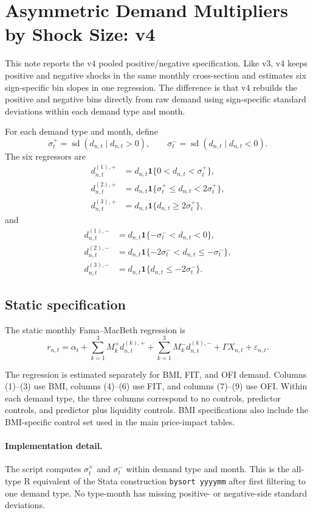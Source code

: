 \documentclass[11pt]{article}
\begin{document}
\section*{Asymmetric Demand Multipliers by Shock Size: v4}

This note reports the v4 pooled positive/negative specification. Like v3, v4
keeps positive and negative shocks in the same monthly cross-section and
estimates six sign-specific bin slopes in one regression. The difference is
that v4 rebuilds the positive and negative bins directly from raw demand using
sign-specific standard deviations within each demand type and month.

For each demand type and month, define
\[
\sigma^+_t = \operatorname{sd}(d_{n,t} \mid d_{n,t} > 0), \qquad
\sigma^-_t = \operatorname{sd}(d_{n,t} \mid d_{n,t} < 0).
\]
The six regressors are
\begin{align*}
d^{(1),+}_{n,t} &= d_{n,t}\mathbf{1}\{0 < d_{n,t} < \sigma^+_t\}, \\
d^{(2),+}_{n,t} &= d_{n,t}\mathbf{1}\{\sigma^+_t \le d_{n,t} < 2\sigma^+_t\}, \\
d^{(3),+}_{n,t} &= d_{n,t}\mathbf{1}\{d_{n,t} \ge 2\sigma^+_t\},
\end{align*}
and
\begin{align*}
d^{(1),-}_{n,t} &= d_{n,t}\mathbf{1}\{-\sigma^-_t < d_{n,t} < 0\}, \\
d^{(2),-}_{n,t} &= d_{n,t}\mathbf{1}\{-2\sigma^-_t < d_{n,t} \le -\sigma^-_t\}, \\
d^{(3),-}_{n,t} &= d_{n,t}\mathbf{1}\{d_{n,t} \le -2\sigma^-_t\}.
\end{align*}
\subsection*{Static specification}

The static monthly Fama--MacBeth regression is
\[
r_{n,t} = \alpha_t
        + \sum_{k=1}^3 M_k^+ d^{(k),+}_{n,t}
        + \sum_{k=1}^3 M_k^- d^{(k),-}_{n,t}
        + \Gamma X_{n,t} + \varepsilon_{n,t}.
\]

The regression is estimated separately for BMI, FIT, and OFI demand. Columns
(1)--(3) use BMI, columns (4)--(6) use FIT, and columns (7)--(9) use OFI.
Within each demand type, the three columns correspond to no controls,
predictor controls, and predictor plus liquidity controls. BMI specifications
also include the BMI-specific control set used in the main price-impact tables.

\paragraph{Implementation detail.}
The script computes $\sigma^+_t$ and $\sigma^-_t$ within demand type and month.
This is the all-type R equivalent of the Stata construction
\texttt{bysort yyyymm} after first filtering to one demand type. No
type-month has missing positive- or negative-side standard deviations.
\end{document}
